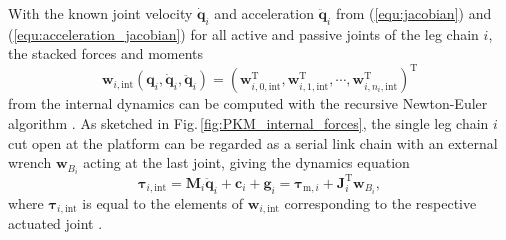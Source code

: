 \documentclass[fleqn,a4paper,10pt]{article}
\newcommand{\bm}[1]{\mathbf{#1}}
\newcommand{\transp}[0]{{\mathrm{T}}}
\renewenvironment{figure}
  {\par\vspace{6pt}\noindent\minipage{\linewidth}}
  {\endminipage\par\vspace{6pt}}
\begin{document}
\begin{multicols}{2}
With the known joint velocity $\dot{\bm{q}}_i$ and acceleration $\ddot{\bm{q}}_i$ from (\ref{equ:jacobian}) and (\ref{equ:acceleration_jacobian}) for all active and passive joints of the leg chain $i$, the stacked forces and moments
%
\begin{equation}
\bm{w}_{i,\mathrm{int}}(\bm{q}_i,\dot{\bm{q}}_i,\ddot{\bm{q}}_i)
=
(\bm{w}_{i,0,\mathrm{int}}^\transp,\bm{w}_{i,1,\mathrm{int}}^\transp,\cdots,\bm{w}_{i,n_i,\mathrm{int}}^\transp)^\transp
\label{equ:intforce_leg}
\end{equation} %
%
from the internal dynamics can be computed with the recursive Newton-Euler algorithm  \cite{KhalilDom2002,SaminFis2013}.
As sketched in Fig.\,\ref{fig:PKM_internal_forces}, the single leg chain $i$ cut open at the platform can be regarded as a serial link chain with an external wrench $\bm{w}_{B_i}$ acting at the last joint, giving the dynamics equation
\begin{equation}
\bm{\tau}_{i,\mathrm{int}}
=\bm{M}_i \ddot{\bm{q}}_i + \bm{c}_i + \bm{g}_i
=\bm{\tau}_{\mathrm{m},i} + \bm{J}_{i}^{\transp} \bm{w}_{B_i},
\label{equ:invdyn_leg}
\end{equation}
%
where $\bm{\tau}_{i,\mathrm{int}}$ is equal to the elements of $\bm{w}_{i,\mathrm{int}}$ corresponding to the respective actuated joint \cite{KhalilDom2002}.

\begin{figure}
    \centering
    
    \vspace{-0.4cm} %
    \label{fig:PKM_internal_forces}
\end{figure}


\end{multicols}
\end{document}
